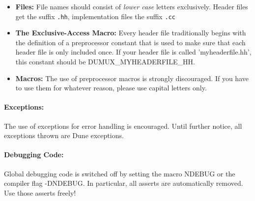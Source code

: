 \begin{itemize}
\item \textbf{Files:} File names should consist of \emph{lower case} letters
      exclusively. Header files get the suffix \texttt{.hh}, implementation files the
      suffix \texttt{.cc}
\item \textbf{The Exclusive-Access Macro:} Every header file traditionally begins
      with the definition of a preprocessor constant that is used to make sure that
      each  header file is only included once. If your header file is called
      'myheaderfile.hh', this constant should be DUMUX\_MYHEADERFILE\_HH.
\item \textbf{Macros:} The use of preprocessor macros is strongly discouraged. If you
      have to use them for whatever reason, please use capital letters only.
\end{itemize}

\paragraph{Exceptions:}
The use of exceptions for error handling is encouraged. Until further notice,
all exceptions thrown are Dune exceptions.

\paragraph{Debugging Code:}
Global debugging code is switched off by setting the macro NDEBUG or the compiler
flag -DNDEBUG. In particular, all asserts are automatically removed. Use those
asserts freely!
